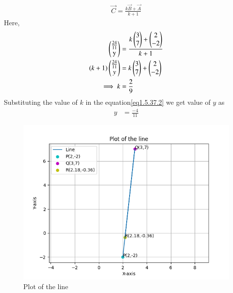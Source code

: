 \documentclass[journal]{IEEEtran}
\begin{document}
\begin{align}
    \vec{C}=\frac{k\vec{B}+\vec{A}}{k+1}\label{eq1.5.37.1}
\end{align}
Here,
\begin{align}
    \myvec{\frac{24}{11}\\$y$} &= \frac{k \myvec{3\\7}+\myvec{2\\-2}}{k+1}\label{eq1.5.37.2}\\ 
    (k+1)\myvec{\frac{24}{11}\\y} &= k\myvec{3\\7}+ \myvec{2\\-2}\\
    \implies k &= \frac{2}{9}
\end{align}
Substituting the value of $k$ in the equation\eqref{eq1.5.37.2} we get value of $y$ as
\begin{align}
    y &= \frac{-4}{11}
\end{align}

\begin{figure}[h!]
   \centering
   \includegraphics[width=0.7\linewidth]{figs/fig.png}
   \caption{Plot of the line}
   \label{stemplot}
\end{figure}
\end{document}
